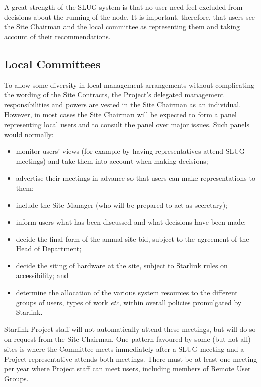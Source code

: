 A great strength of the SLUG system is that no user need feel excluded from
decisions about the running of the node.  It is important, therefore,
that users see the Site Chairman and the local committee as representing
them and taking account of their recommendations.

\subsection{Local Committees}

To allow some diversity in local management arrangements without
complicating the wording of the Site Contracts, the
Project's delegated management responsibilities and powers are vested
in the Site Chairman as an individual.  However, in most
cases the Site Chairman will be expected to form a panel representing
local users and to consult the panel over major issues.  Such panels
would normally:
\begin{itemize}
\item monitor users' views (for example by having representatives
      attend SLUG meetings)
      and take them into account when making decisions;
\item advertise their meetings in advance so that users can make
      representations to them:
\item include the Site Manager (who will be prepared to act as secretary);
\item inform users what has been discussed and what decisions have been made;
\item decide the final form of the annual site bid, subject to the
      agreement of the Head of Department;
\item decide the siting of hardware at the site, subject to Starlink
      rules on accessibility; and
\item determine the allocation of the various system resources to
      the different groups of users, types of work {\it etc},
      within overall policies promulgated by Starlink.
\end{itemize}
Starlink Project staff will not automatically attend these meetings,
but will do so on request from the Site Chairman.  One pattern
favoured by some (but not all) sites is where the Committee meets
immediately after a SLUG meeting and a Project representative
attends both meetings.  There must be at least one meeting per
year where Project staff can meet users, including members of
Remote User Groups.

\pagebreak

